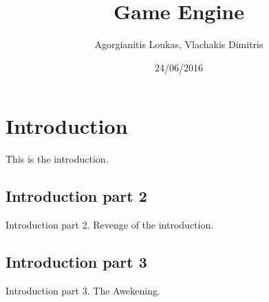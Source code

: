 \documentclass[10 pt]{article}
\title{Game Engine}
\date{24/06/2016}
\author{Agorgianitis Loukas, Vlachakis Dimitris}
\begin{document}
\maketitle
\newpage
\tableofcontents
\newpage
{}

\section{Introduction}
This is the introduction.

\subsection{Introduction part 2}
Introduction part 2. Revenge of the introduction.

\subsection{Introduction part 3}
Introduction part 3. The Awekening.

\newpage
\nocite{*}


\end{document}
